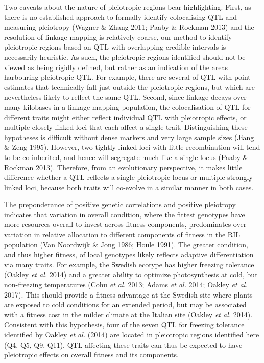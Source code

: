 \documentclass[]{article}
\begin{document}
Two caveats about the nature of pleiotropic regions bear highlighting.
First, as there is no established approach to formally identify colocalising QTL and measuring pleiotropy (Wagner \& Zhang 2011; Paaby \& Rockman 2013) and the resolution of linkage mapping is relatively coarse, our method to identify pleiotropic regions based on QTL with overlapping credible intervals is necessarily heuristic.
As such, the pleiotropic regions identified should not be viewed as being rigidly defined, but rather as an indication of the areas harbouring pleiotropic QTL.
For example, there are several of QTL with point estimates that technically fall just outside the pleiotropic regions, but which are nevertheless likely to reflect the same QTL.
Second, since linkage decays over many kilobases in a linkage-mapping population, the colocalisation of QTL for different traits might either reflect individual QTL with pleiotropic effects, or multiple closely linked loci that each affect a single trait.
Distinguishing these hypotheses is difficult without dense markers and very large sample sizes (Jiang \& Zeng 1995).
However, two tightly linked loci with little recombination will tend to be co-inherited, and hence will segregate much like a single locus (Paaby \& Rockman 2013). Therefore, from an evolutionary perspective, it makes little difference whether a QTL reflects a single pleiotropic locus or multiple strongly linked loci, because both traits will co-evolve in a similar manner in both cases.

The preponderance of positive genetic correlations and positive pleiotropy indicates that variation in overall condition, where the fittest genotypes have more resources overall to invest across fitness components, predominates over variation in relative allocation to different components of fitness in the RIL population (Van Noordwijk \& Jong 1986; Houle 1991). The greater condition, and thus higher fitness, of local genotypes likely reflects adaptive differentiation via many traits. For example, the Swedish ecotype has higher freezing tolerance (Oakley \emph{et al.} 2014) and a greater ability to optimize photosynthesis at cold, but non-freezing temperatures (Cohu \emph{et al.} 2013; Adams \emph{et al.} 2014; Oakley \emph{et al.} 2017). This should provide a fitness advantage at the Swedish site where plants are exposed to cold conditions for an extended period, but may be associated with a fitness cost in the milder climate at the Italian site (Oakley \emph{et al.} 2014). Consistent with this hypothesis, four of the seven QTL for freezing tolerance identified by Oakley \emph{et al.} (2014) are located in pleiotropic regions identified here (Q4, Q5, Q9, Q11). QTL affecting these traits can thus be expected to have pleiotropic effects on overall fitness and its components.
\end{document}
